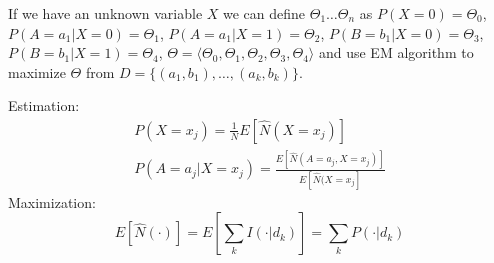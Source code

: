 If we have an unknown variable $X$ we can define $\Theta_{1} \dots \Theta_{n}$ as $P(X = 0) = \Theta_{0}$, $P(A = a_{1} | X = 0) = \Theta_{1}$, $P(A = a_{1} | X = 1) = \Theta_{2}$, $P(B = b_{1} | X = 0) = \Theta_{3}$, $P(B = b_{1} | X = 1) = \Theta_{4}$, $\Theta = \langle \Theta_{0}, \Theta_{1}, \Theta_{2}, \Theta_{3}, \Theta_{4} \rangle$ and use EM algorithm to maximize $\Theta$ from $D = \{(a_{1}, b_{1}), \dots, (a_{k}, b_{k})\}$.

Estimation:
\begin{equation}
    \begin{multlined}
        P(X = x_{j}) = \frac{1}{N} E [\hat{N}(X = x_{j})] \\
        P(A = a_{j} | X = x_{j}) = \frac{E[\hat{N}(A = a_{j}, X = x_{j})]}{E[\hat{N}(X = x_{j}]}
    \end{multlined}
\end{equation}
Maximization:
\begin{equation}
    E[\hat{N}(\cdot)] = E\left[\sum_{k}I(\cdot|d_{k})\right] = \sum_{k} P(\cdot | d_{k})
\end{equation}
